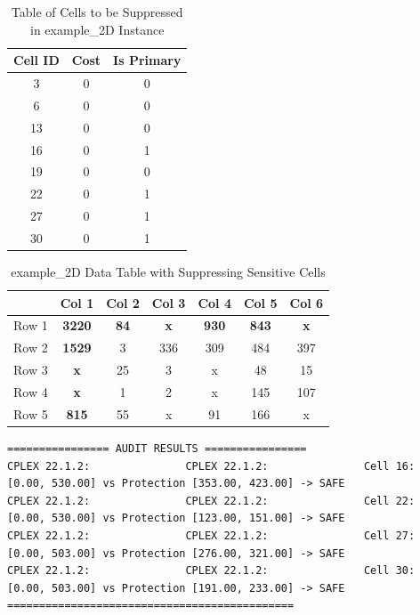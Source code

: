 \documentclass[11pt,a4paper]{article}
\begin{document}
\begin{table}[H]
    \centering
    \begin{tabular}{c | c | c}
        \textbf{Cell ID} & \textbf{Cost} & \textbf{Is Primary} \\
        \toprule
        3          & 0          & 0 \\        
        6          & 0          & 0 \\      
        13         & 0          & 0 \\      
        16         & 0          & 1 \\      
        19         & 0          & 0 \\      
        22         & 0          & 1 \\      
        27         & 0          & 1 \\      
        30         & 0          & 1 \\
    \end{tabular}
    \caption{Table of Cells to be Suppressed in example\_2D Instance}
    \label{tab:example2D-suppressed-cells}
\end{table}


\begin{table}[H]
    \centering
    \begin{tabular}{l | c c c c c c}
         & Col 1 & Col 2 & Col 3 & Col 4 & Col 5 & Col 6 \\
        \toprule
        Row 1     & \textbf{3220} & \textbf{84} & \textbf{x} & \textbf{930} & \textbf{843} & \textbf{x} \\
        Row 2     & \textbf{1529} & 3  & 336 & 309  & 484 & 397 \\
        Row 3     & \textbf{x}    & 25 & 3   & x & 48  & 15  \\
        Row 4     & \textbf{x}    & 1  & 2   & x & 145 & 107  \\
        Row 5     & \textbf{815}  & 55 & x   & 91  & 166 & x \\
    \end{tabular}
    \caption{example\_2D Data Table with Suppressing Sensitive Cells}
    \label{tab:example2D-suppressed-table}
\end{table}

\begin{lstlisting}
================ AUDIT RESULTS ================
CPLEX 22.1.2:               CPLEX 22.1.2:               Cell 16: [0.00, 530.00] vs Protection [353.00, 423.00] -> SAFE
CPLEX 22.1.2:               CPLEX 22.1.2:               Cell 22: [0.00, 530.00] vs Protection [123.00, 151.00] -> SAFE
CPLEX 22.1.2:               CPLEX 22.1.2:               Cell 27: [0.00, 503.00] vs Protection [276.00, 321.00] -> SAFE
CPLEX 22.1.2:               CPLEX 22.1.2:               Cell 30: [0.00, 503.00] vs Protection [191.00, 233.00] -> SAFE
=============================================
\end{lstlisting}
\end{document}
